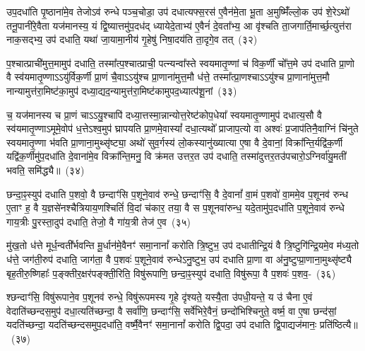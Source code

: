 उप॒\-दधा॑ति पृ॒ष्ठाना॑मे॒व तेजो\-ऽव॑ रुन्धे पञ्च॒चोडा॒ उप॑ दधात्यफ्स॒रस॑ ए॒वैन॑मे॒ता भू॒ता अ॒मुष्मिँ॑ल्लो॒क उप॑ शे॒रे\-ऽथो॑ तनू॒पानी॑रे॒वैता यज॑मानस्य॒ यं द्वि॒ष्यात्तमु॑प॒दध॑द् ध्यायेदे॒ताभ्य॑ ए॒वैनं॑ दे॒वता᳚भ्य॒ आ वृ॑श्चति ता॒जगार्ति॒मार्च्छ॒त्युत्त॑रा नाक॒सद्भ्य॒ उप॑ दधाति॒ यथा॑ जा॒यामा॒नीय॑ गृ॒हेषु॑ निषा॒दय॑ति ता॒दृगे॒व तत्~(३२)\ip

प॒श्चात्प्राची॑मुत्त॒मामुप॑ दधाति॒ तस्मा᳚त्प॒श्चात्प्राची॒ पत्न्यन्वा᳚स्ते स्वयमा\-तृ॒ण्णां च॑ विक॒र्णीं चो᳚त्त॒मे उप॑ दधाति प्रा॒णो वै स्व॑यमातृ॒ण्णा\-ऽऽ\-यु॑र्विक॒र्णी प्रा॒णं चै॒वा\-ऽऽ\-यु॑श्च प्रा॒णाना॑मुत्त॒मौ ध॑त्ते॒ तस्मा᳚त्प्रा॒णश्चा\-ऽऽ\-यु॑श्च प्रा॒णाना॑मुत्त॒मौ नान्यामुत्त॑रा॒मिष्ट॑का॒मुप॑ दध्या॒द्यद॒न्यामुत्त॑रा॒मिष्ट॑कामुपद॒ध्यात्प॑शू॒नां~(३३)\ip

च॒ यज॑मानस्य च प्रा॒णं चा\-ऽऽ\-यु॒श्चापि॑ दध्या॒त्तस्मा॒न्नान्योत्त॒रेष्ट॑कोप॒धेया᳚ स्वयमा\-तृ॒ण्णामुप॑ दधात्य॒सौ वै स्व॑यमातृ॒ण्णा\-ऽ\-मूमे॒वोप॑ ध॒त्ते\-ऽश्व॒मुप॑ घ्रापयति प्रा॒णमे॒वास्यां᳚ दधा॒त्यथो᳚ प्राजाप॒त्यो वा अश्वः॑ प्र॒जा\-प॑तिनै॒वाग्निं चि॑नुते स्वयमा\-तृ॒ण्णा भ॑वति प्रा॒णाना॒मुथ्सृ॑ष्ट्या॒ अथो॑ सुव॒र्गस्य॑ लो॒कस्यानु॑ख्यात्या ए॒षा वै दे॒वानां॒ विक्रा᳚न्ति॒र्यद्वि॑क॒र्णी यद्वि॑क॒र्णीमु॑प॒\-दधा॑ति दे॒वाना॑मे॒व विक्रा᳚न्ति॒मनु॒ वि क्र॑मत उत्तर॒त उप॑ दधाति॒ तस्मा॑दुत्तर॒तउ॑पचारो॒\-ऽग्निर्वा॑यु॒मती॑ भवति॒ समि॑द्ध्यै॥~(३४)\ip

{\anuvakamend[{सम्भृ॑तं॒ यन्ना॑क॒सदो॒ यन्ना॑क॒सद॒स्तत्प॑शू॒नामे॒षां वै द्वाविꣳ॑शतिश्च}]}

छन्दा॒ꣴ॒स्युप॑ दधाति प॒शवो॒ वै छन्दाꣳ॑सि प॒शूने॒वाव॑ रुन्धे॒ छन्दाꣳ॑सि॒ वै दे॒वानां᳚ वा॒मं प॒शवो॑ वा॒ममे॒व प॒शूनव॑ रुन्ध ए॒ताꣳ ह॒ वै य॒ज्ञसे॑नश्चैत्रियाय॒णश्चितिं॑ वि॒दां च॑कार॒ तया॒ वै स प॒शूनवा॑रुन्ध॒ यदे॒तामु॑प॒\-दधा॑ति प॒शूने॒वाव॑ रुन्धे गाय॒त्रीः पु॒रस्ता॒दुप॑ दधाति॒ तेजो॒ वै गा॑य॒त्री तेज॑ ए॒व~(३५)\ip

मु॑ख॒तो ध॑त्ते मूर्ध॒न्वती᳚र्भवन्ति मू॒र्धान॑मे॒वैनꣳ॑ समा॒नानां᳚ करोति त्रि॒ष्टुभ॒ उप॑ दधातीन्द्रि॒यं वै त्रि॒ष्टुगि॑न्द्रि॒यमे॒व म॑ध्य॒तो ध॑त्ते॒ जग॑ती॒रुप॑ दधाति॒ जाग॑ता॒ वै प॒शवः॑ प॒शूने॒वाव॑ रुन्धे\-ऽनु॒ष्टुभ॒ उप॑ दधाति प्रा॒णा वा अ॑नु॒ष्टुप्प्रा॒णाना॒मुथ्सृ॑ष्ट्यै बृह॒तीरु॒ष्णिहाः᳚ प॒ङ्क्तीर॒क्षर॑पङ्क्ती॒रिति॒ विषु॑रूपाणि॒ छन्दा॒ꣴ॒स्युप॑ दधाति॒ विषु॑रूपा॒ वै प॒शवः॑ प॒शव॒-~(३६)\ip

श्छन्दाꣳ॑सि॒ विषु॑रूपाने॒व प॒शूनव॑ रुन्धे॒ विषु॑रूपमस्य गृ॒हे दृ॑श्यते॒ यस्यै॒ता उ॑पधी॒यन्ते॒ य उ॑ चैना ए॒वं वेदाति॑च्छन्दस॒मुप॑ दधा॒त्यति॑च्छन्दा॒ वै सर्वा॑णि॒ छन्दाꣳ॑सि॒ सर्वे॑भिरे॒वैनं॒ छन्दो॑भिश्चिनुते॒ वर्ष्म॒ वा ए॒षा छन्द॑सां॒ यदति॑च्छन्दा॒ यदति॑च्छन्दसमुप॒\-दधा॑ति॒ वर्ष्मै॒वैनꣳ॑ समा॒नानां᳚ करोति द्वि॒पदा॒ उप॑ दधाति द्वि॒पाद्यज॑मानः॒ प्रति॑ष्ठित्यै॥~(३७)\ip

